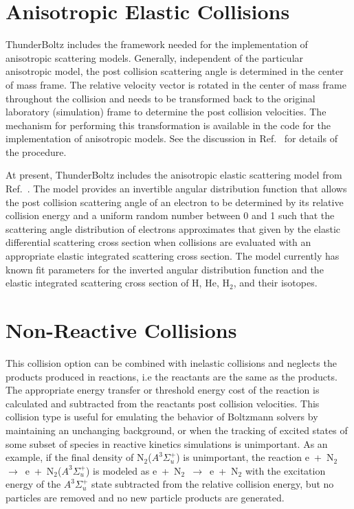 \documentclass[letterpaper,10pt,english,openany,oneside]{sphinxmanual}
\begin{document}
\section{Anisotropic Elastic Collisions} 
ThunderBoltz includes the framework needed for the implementation of anisotropic
scattering models. Generally, independent of the particular anisotropic model, the post
collision scattering angle is determined in the center of mass frame. The relative
velocity vector is rotated in the center of mass frame throughout the collision and needs
to be transformed back to the original laboratory (simulation) frame to determine the
post collision velocities. The mechanism for performing this transformation is available
in the code for the implementation of anisotropic models. See the discussion in
Ref.~\cite{donko2021} for details of the procedure.

At present, ThunderBoltz includes the anisotropic elastic scattering model from
Ref.~\cite{Park_2022}. The model provides an invertible angular distribution
function that allows the post collision scattering angle of an electron to be determined
by its relative collision energy and a uniform random number between 0 and 1 such that
the scattering angle distribution of electrons approximates that given by the elastic
differential scattering cross section when collisions are evaluated with an appropriate
elastic integrated scattering cross section. The model currently has known fit parameters
for the inverted angular distribution function and the elastic integrated scattering
cross section of H, He, H$_2$, and their isotopes.

\section{Non-Reactive Collisions} 
\label{Sect:Non-Reactive_Collision}
This collision option can be combined with inelastic collisions and neglects the products
produced in reactions, i.e the reactants are the same as the products.  The appropriate
energy transfer or threshold energy cost of the reaction is calculated and subtracted
from the reactants post collision velocities.  This collision type is useful for
emulating the behavior of Boltzmann solvers by maintaining an unchanging background, or
when the tracking of excited states of some subset of species in reactive kinetics
simulations is unimportant. As an example, if the final density of  
N$_2$($A^3\Sigma_u^+$) is unimportant, the reaction
e~+~N$_2$~$\to$~e~+~N$_2$($A^3\Sigma_u^+$) is modeled as e~+~N$_2$~$\to$~e~+~N$_2$ with
the excitation energy of the $A^3\Sigma_u^+$ state subtracted from the relative collision
energy, but no particles are removed and no new particle products are generated.
\end{document}
